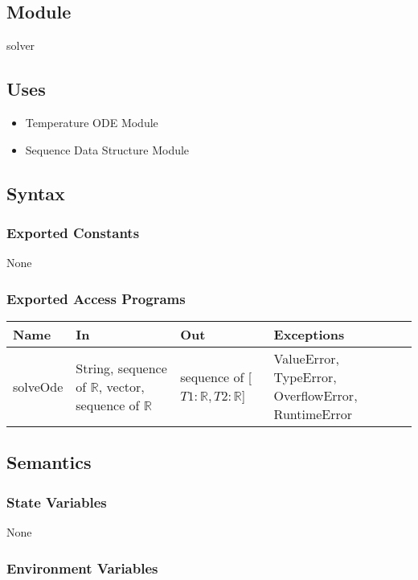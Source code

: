 \documentclass[12pt, titlepage]{article}
\begin{document}
\subsection{Module}

solver

\subsection{Uses}

\begin{itemize}
    \item Temperature ODE Module
    \item Sequence Data Structure Module
\end{itemize}

\subsection{Syntax}

\subsubsection{Exported Constants}
None 

\subsubsection{Exported Access Programs}

\begin{tabular}{p{1.5cm} p{5.5cm} p{4.5cm} p{3cm}}
\hline
\textbf{Name} & \textbf{In} & \textbf{Out} & \textbf{Exceptions} \\
\hline
solveOde & String, sequence of $\mathbb{R}$, vector, sequence of $\mathbb{R}$ & sequence of [$T1: \mathbb{R}, T2: \mathbb{R}$] & ValueError, TypeError, OverflowError, RuntimeError \\
\hline
\end{tabular}

\subsection{Semantics}

\subsubsection{State Variables}

None

\subsubsection{Environment Variables}
\end{document}
